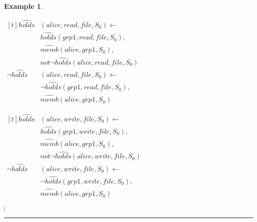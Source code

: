 \documentclass[11pt, twocolumn]{article}
\newtheorem{vexmpl}{Example}
\newenvironment{vexample}
  {\begin{vexmpl}\rm}
  {\rule{2mm}{2mm}\end{vexmpl}}
\begin{document}
\begin{vexample}
\begin{enumerate}
              \begin{math}
                \begin{aligned}[t]
                  \hat{holds}&(alice, read, file, S_{0}) \leftarrow \\
                  & \hat{holds}(grp1, read, file, S_{0}), \\
                  & \hat{memb}(alice, grp1, S_{0}), \\
                  & not \lnot \hat{holds}(alice, read, file, S_{0}) \\
                  \lnot \hat{holds}&(alice, read, file, S_{0}) \leftarrow \\
                  & \lnot \hat{holds}(grp1, read, file, S_{0}), \\
                  & \hat{memb}(alice, grp1, S_{0})
                \end{aligned}
              \end{math}

              \begin{math}
                \begin{aligned}[t]
                  \hat{holds}&(alice, write, file, S_{0}) \leftarrow \\
                  & \hat{holds}(grp1, write, file, S_{0}), \\
                  & \hat{memb}(alice, grp1, S_{0}), \\
                  & not \lnot \hat{holds}(alice, write, file, S_{0}) \\
                  \lnot \hat{holds}&(alice, write, file, S_{0}) \leftarrow \\
                  & \lnot \hat{holds}(grp1, write, file, S_{0}), \\
                  & \hat{memb}(alice, grp1, S_{0})
                \end{aligned}
              \end{math}

              \hspace{1cm} $\vdots$


\end{enumerate}
\end{vexample}
\end{document}

